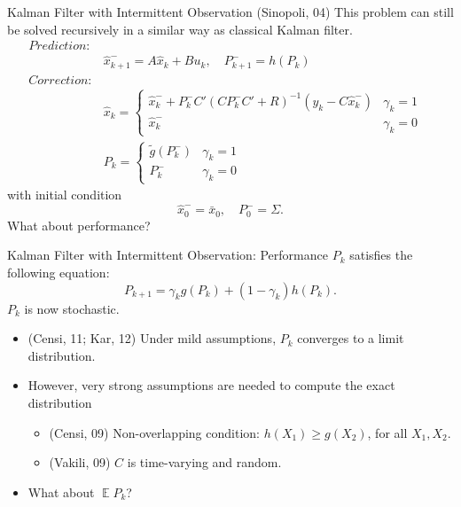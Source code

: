 \documentclass[10pt]{beamer}
\DeclareMathOperator{\1}{\textbf{1}}
\DeclareMathOperator{\E}{\mathbb E}
\begin{document}
  \begin{frame}{Kalman Filter with Intermittent Observation}
    (Sinopoli, 04) This problem can still be solved recursively in a similar way as classical Kalman filter. 
    \begin{align*}
      Prediction:&&\\
      &\hat x _{k + 1}^-  = A \hat x_{k} + Bu_k  , \quad P_{k + 1}^-  = h(P_k)\\
      Correction:&&\\
      &\hat x_{k} = \begin{cases}
	\hat x_{k}^-  + P_k^- C'(CP_k^- C'+R)^{-1} (y_k  - C \hat x _{k}^- ) & \gamma_ k = 1\\ 
	\hat x_{k}^-   & \gamma_ k = 0 
      \end{cases}\\
      &P_{k} =\begin{cases}
	\tilde g(P_k^-) & \gamma_k = 1\\
	P_k^-&\gamma_k = 0
      \end{cases}
    \end{align*}
    with initial condition
    \begin{displaymath}
      \hat x_{0}^-  = \bar x_0 ,\quad P_{0}^-  = \Sigma.
    \end{displaymath}
    What about performance?

  \end{frame}

  \begin{frame}{Kalman Filter with Intermittent Observation: Performance}
    $P_k$ satisfies the following equation:
    \begin{equation}
      P_{k+1}= \gamma_k g(P_k) + (1-\gamma_k) h(P_k).
      \label{eq:basicricattieqn}
    \end{equation}
    $P_k$ is now stochastic. 
    \begin{itemize}
      \item (Censi, 11; Kar, 12) Under mild assumptions, $P_k$ converges to a limit distribution.
      \item However, very strong assumptions are needed to compute the exact distribution 
	\begin{itemize}
	  \item (Censi, 09) Non-overlapping condition: $h(X_1)\geq g(X_2)$, for all $X_1,X_2$.
	  \item (Vakili, 09) $C$ is time-varying and random.
	\end{itemize}
      \item What about $\E P_k$?
    \end{itemize}
  \end{frame}
\end{document}
